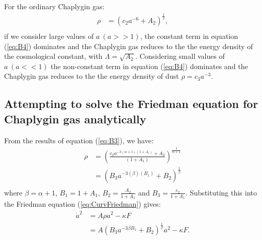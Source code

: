 \documentclass[a4paper, 11pt]{FSKH_623_Report}
\numberwithin{equation}{section}
\newcommand{\brac}[1]{\left(#1\right)}
\begin{document}
For the ordinary Chaplygin gas:
\begin{equation}\label{eq:B4}
\begin{split}
\rho&=\brac{c_{2}a^{-6}+A_{2}}^{\frac{1}{2}},\\
\end{split}
\end{equation}
if we consider large values of $a\ \brac{a>>1}$, the constant term in equation (\ref{eq:B4}) dominates and the Chaplygin gas reduces to the the energy density of the cosmological constant, with $\Lambda=\sqrt{A_{2}}$. Considering small values of $a\ \brac{a<<1}$ the non-constant term in equation (\ref{eq:B4}) dominates and the Chaplygin gas reduces to the the energy density of dust $\rho=c_{3}a^{-3}$.
\subsection*{Attempting to solve the Friedman equation for Chaplygin gas analytically}
From the results of equation (\ref{eq:B3}), we have:
\begin{equation}\label{eq:B5}
\begin{split}
\rho&=\brac{\frac{c_{2}a^{-3\brac{\alpha+1}\brac{1+A_{1}}}+A_{2}}{\brac{1+A_{1}}}}^{\frac{1}{\alpha+1}}\\
&=\brac{B_{3}a^{-3\brac{\beta}\brac{B_{1}}}+B_{2}}^{\frac{1}{\beta}}\\
\end{split}
\end{equation}
where $\beta=\alpha+1$, $B_{1}=1+A_{1}$, $B_{2}=\frac{A_{2}}{1+A_{1}}$ and $B_{3}=\frac{c_{2}}{1+A_{1}}$. Substituting this into the Friedman equation (\ref{eq:CurvFriedman}) gives:
\begin{equation}\label{eq:B6}
\begin{split}
\dot{a}^{2} &= A\rho a^{2}-\kappa F\\
&= A\brac{B_{3}a^{-3\beta B_{1}}+B_{2}}^{\frac{1}{\beta}} a^{2}-\kappa F.\\
\end{split}
\end{equation}
\end{document}
